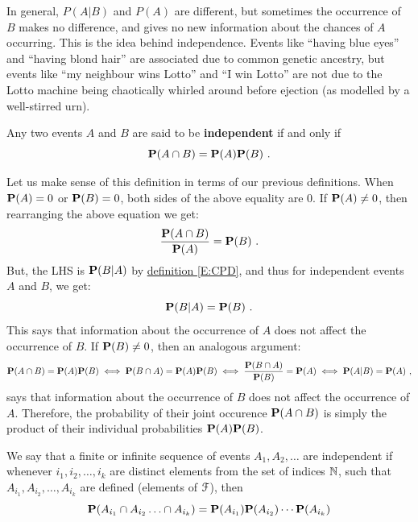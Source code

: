 In general, $P(A | B)$ and $P(A)$ are different, but sometimes the
occurrence of $B$ makes no difference, and gives no new information about the
chances of $A$ occurring.  This is the idea behind independence. Events
like ``having blue eyes'' and ``having blond hair'' are
associated due to common genetic ancestry, but  events like ``my neighbour wins Lotto'' and ``I win Lotto'' are not due to the Lotto machine being chaotically whirled around before ejection (as modelled by a well-stirred urn).

\begin{definition}\label{D:IndOf2Events}
 Any two events $A$ and $B$ are said to be {\bf independent} if and only if
 \begin{equation}\label{E:PofAB=PAPB}
 \mathbf{P}(A \cap B) = \mathbf{P}(A) \mathbf{P}(B) \ .
 \end{equation}
 \end{definition}
 Let us make sense of this definition in terms of our previous definitions.  When $\mathbf{P}(A)=0$ or $\mathbf{P}(B)=0$, both sides of the above equality are $0$.  If $\mathbf{P}(A) \neq 0$, then rearranging the above equation we get:
 \[
 \frac{\mathbf{P}(A \cap B)}{\mathbf{P}(A)} = \mathbf{P}(B) \ .
 \]
 But, the LHS is $\mathbf{P}(B|A)$ by \hyperref[E:CPD]{definition \ref*{E:CPD}}, and thus for independent events $A$ and $B$, we get:
 \[
 \mathbf{P}(B|A) = \mathbf{P}(B) \ .
 \]
This says that information about the occurrence of $A$ does not affect the occurrence of $B$.  If $\mathbf{P}(B) \neq 0$, then an analogous argument:
{\scriptsize
\[
\mathbf{P}(A \cap B) = \mathbf{P}(A) \mathbf{P}(B) \iff \mathbf{P}(B \cap A) = \mathbf{P}(A) \mathbf{P}(B) \iff \frac{\mathbf{P}(B \cap A)}{\mathbf{P}(B)} = \mathbf{P}(A) \iff  \mathbf{P}(A|B) = \mathbf{P}(A) \ ,
\]
}
says that information about the occurrence of $B$ does not affect the occurrence of $A$.  Therefore, the probability of their joint occurence $\mathbf{P}(A \cap B)$ is simply the product of their individual probabilities $\mathbf{P}(A) \mathbf{P}(B)$.

\begin{definition}\label{D:IndOfSeqOfEvents}
We say that a finite or infinite sequence of events $A_1,A_2,\ldots$ are independent if whenever $i_1,i_2,\ldots,i_k$ are distinct elements from the set of indices $\mathbb{N}$, such that $A_{i_1},A_{i_2},\ldots,A_{i_k}$ are defined (elements of $\mathcal{F}$), then
\[
\mathbf{P}(A_{i_1} \cap A_{i_2} \ldots \cap A_{i_k})  =  \mathbf{P}(A_{i_1} ) \mathbf{P}(A_{i_2})  \cdots \mathbf{P}(A_{i_k}) 
\]
\end{definition}

